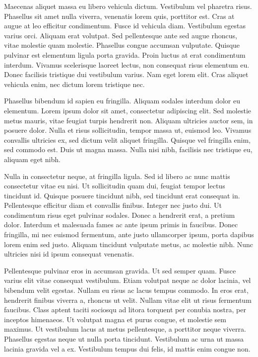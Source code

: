 Maecenas aliquet massa eu libero vehicula dictum. Vestibulum vel pharetra risus. Phasellus sit amet nulla viverra, venenatis lorem quis, porttitor est. Cras at augue at leo efficitur condimentum. Fusce id vehicula diam. Vestibulum egestas varius orci. Aliquam erat volutpat. Sed pellentesque ante sed augue rhoncus, vitae molestie quam molestie. Phasellus congue accumsan vulputate. Quisque pulvinar est elementum ligula porta gravida. Proin luctus at erat condimentum interdum. Vivamus scelerisque laoreet lectus, non consequat risus elementum eu. Donec facilisis tristique dui vestibulum varius. Nam eget lorem elit. Cras aliquet vehicula enim, nec dictum lorem tristique nec.

Phasellus bibendum id sapien eu fringilla. Aliquam sodales interdum dolor eu elementum. Lorem ipsum dolor sit amet, consectetur adipiscing elit. Sed molestie metus mauris, vitae feugiat turpis hendrerit non. Aliquam ultricies auctor sem, in posuere dolor. Nulla et risus sollicitudin, tempor massa ut, euismod leo. Vivamus convallis ultricies ex, sed dictum velit aliquet fringilla. Quisque vel fringilla enim, sed commodo est. Duis ut magna massa. Nulla nisi nibh, facilisis nec tristique eu, aliquam eget nibh.

Nulla in consectetur neque, at fringilla ligula. Sed id libero ac nunc mattis consectetur vitae eu nisi. Ut sollicitudin quam dui, feugiat tempor lectus tincidunt id. Quisque posuere tincidunt nibh, sed tincidunt erat consequat in. Pellentesque efficitur diam et convallis finibus. Integer nec justo dui. Ut condimentum risus eget pulvinar sodales. Donec a hendrerit erat, a pretium dolor. Interdum et malesuada fames ac ante ipsum primis in faucibus. Donec fringilla, mi nec euismod fermentum, ante justo ullamcorper ipsum, porta dapibus lorem enim sed justo. Aliquam tincidunt vulputate metus, ac molestie nibh. Nunc ultricies nisi id ipsum consequat venenatis.

Pellentesque pulvinar eros in accumsan gravida. Ut sed semper quam. Fusce varius elit vitae consequat vestibulum. Etiam volutpat neque ac dolor lacinia, vel bibendum velit egestas. Nullam eu risus ac lacus tempus commodo. In eros erat, hendrerit finibus viverra a, rhoncus ut velit. Nullam vitae elit ut risus fermentum faucibus. Class aptent taciti sociosqu ad litora torquent per conubia nostra, per inceptos himenaeos. Ut volutpat magna et purus congue, et molestie sem maximus. Ut vestibulum lacus at metus pellentesque, a porttitor neque viverra. Phasellus egestas neque ut nulla porta tincidunt. Vestibulum ac urna ut massa lacinia gravida vel a ex. Vestibulum tempus dui felis, id mattis enim congue non.

